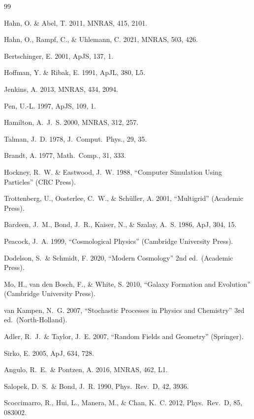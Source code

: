 \documentclass[12pt]{article}
\begin{document}
\begin{thebibliography}{99}

Hahn, O. \& Abel, T. 2011, MNRAS, 415, 2101.

Hahn, O., Rampf, C., \& Uhlemann, C. 2021, MNRAS, 503, 426.

Bertschinger, E. 2001, ApJS, 137, 1.

Hoffman, Y. \& Ribak, E. 1991, ApJL, 380, L5.

Jenkins, A. 2013, MNRAS, 434, 2094.

Pen, U.-L. 1997, ApJS, 109, 1.

Hamilton, A.~J.~S. 2000, MNRAS, 312, 257.

Talman, J.~D. 1978, J.\ Comput.\ Phys., 29, 35.

Brandt, A. 1977, Math.\ Comp., 31, 333.

Hockney, R.~W. \& Eastwood, J.~W. 1988, ``Computer Simulation Using
Particles'' (CRC Press).

Trottenberg, U., Oosterlee, C.~W., \& Sch\"uller, A. 2001,
``Multigrid'' (Academic Press).

Bardeen, J.~M., Bond, J.~R., Kaiser, N., \& Szalay, A.~S. 1986,
ApJ, 304, 15.

Peacock, J.~A. 1999, ``Cosmological Physics'' (Cambridge
University Press).

Dodelson, S.\ \& Schmidt, F. 2020, ``Modern Cosmology'' 2nd ed.\
(Academic Press).

Mo, H., van den Bosch, F., \& White, S. 2010, ``Galaxy Formation
and Evolution'' (Cambridge University Press).

van Kampen, N.~G. 2007, ``Stochastic Processes in Physics and
Chemistry'' 3rd ed.\ (North-Holland).

Adler, R.~J.\ \& Taylor, J.~E. 2007, ``Random Fields and
Geometry'' (Springer).

Sirko, E. 2005, ApJ, 634, 728.

Angulo, R.~E.\ \& Pontzen, A. 2016, MNRAS, 462, L1.

Salopek, D.~S.\ \& Bond, J.~R. 1990, Phys.\ Rev.\ D, 42, 3936.

Scoccimarro, R., Hui, L., Manera, M., \& Chan, K.~C. 2012,
Phys.\ Rev.\ D, 85, 083002.

\end{thebibliography}
\end{document}
